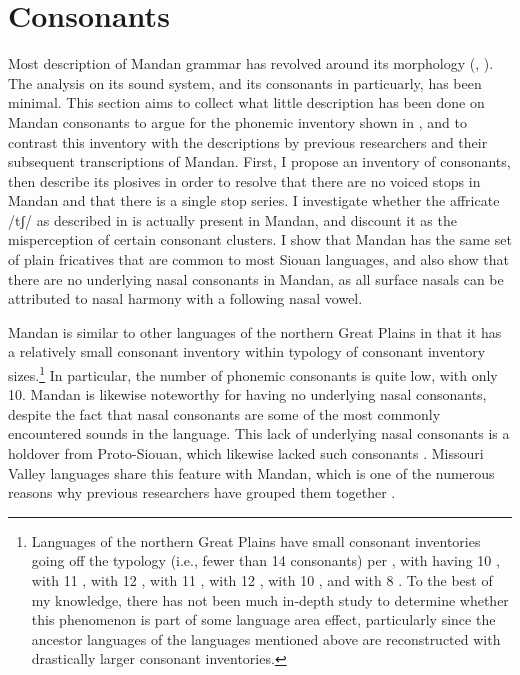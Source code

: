 \section{Consonants}\label{consonants}

Most description of Mandan grammar has revolved around its morphology (\citealt{kennard1936}, \citealt{hollow1970}). The analysis on its sound system, and its consonants in particuarly, has been minimal. This section aims to collect what little description has been done on Mandan consonants to argue for the phonemic inventory shown in , and to contrast this inventory with the descriptions by previous researchers and their subsequent transcriptions of Mandan. First, I propose an inventory of consonants, then describe its plosives in order to resolve that there are no voiced stops in Mandan and that there is a single stop series. I investigate whether the affricate /tʃ/ as described in \citet{kennard1936} is actually present in Mandan, and discount it as the misperception of certain consonant clusters. I show that Mandan has the same set of plain fricatives that are common to most Siouan languages, and also show that there are no underlying nasal consonants in Mandan, as all surface nasals can be attributed to nasal harmony with a following nasal vowel.

Mandan is similar to other languages of the northern Great Plains in that it has a relatively small consonant inventory within  typology of consonant inventory sizes.\footnote{Languages of the northern Great Plains have small consonant inventories going off the typology (i.e., fewer than 14 consonants) per \citet{maddieson2013b}, with  having 10 \citep[27]{boyle2007},  with 11 \citep[12]{graczyk2007},  with 12 \citep[1]{parksbeltranwaters1979},  with 11 \citep[214]{leman2013},  with 12 \citep[4]{picard1994},  with 10 \citep[8]{wolfart1981}, and  with 8 \citep[13]{parks1976}. To the best of my knowledge, there has not been much in-depth study to determine whether this phenomenon is part of some language area effect, particularly since the ancestor languages of the languages mentioned above are reconstructed with drastically larger consonant inventories.} In particular, the number of phonemic consonants is quite low, with only 10. Mandan is likewise noteworthy for having no underlying nasal consonants, despite the fact that nasal consonants are some of the most commonly encountered sounds in the language. This lack of underlying nasal consonants is a holdover from Proto-Siouan, which likewise lacked such consonants \citep{rankinetalnd}. Missouri Valley languages share this feature with Mandan, which is one of the numerous reasons why previous researchers have grouped them together \citep{rankin2010}.


